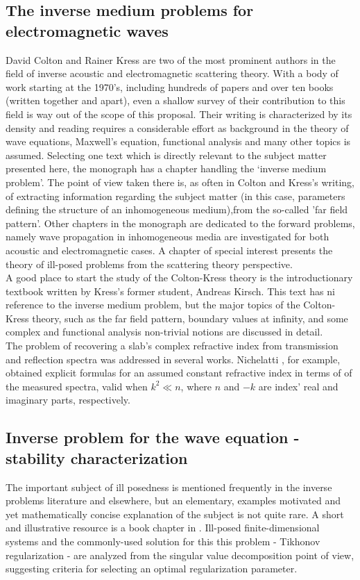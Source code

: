 \documentclass[12pt,twoside]{report}
\begin{document}
\subsection{The inverse medium problems for electromagnetic waves}
David Colton and Rainer Kress are two of the most prominent authors in the field of inverse acoustic and electromagnetic scattering theory. With a body of work starting at the 1970's, including hundreds of papers and over ten books (written together and apart), even a shallow survey of their contribution to this field is way out of the scope of this proposal. Their writing is characterized by its density and reading requires a considerable effort as background in the theory of wave equations, Maxwell's equation, functional analysis and many other topics is assumed. Selecting one text which is directly relevant to the subject matter presented here, the monograph \cite{ColtonKress1997} has a chapter handling the `inverse medium problem'. The point of view taken there is, as often in Colton and Kress's writing, of extracting information regarding the subject matter (in this case, parameters defining the structure of an inhomogeneous medium),from the so-called 'far field pattern'. Other chapters in the monograph are dedicated to the forward problems, namely wave propagation in inhomogeneous media are investigated for both acoustic and electromagnetic cases. A chapter of special interest presents the theory of ill-posed problems from the scattering theory perspective.\\
A good place to start the study of the Colton-Kress theory is the introductionary textbook \cite{Kirsch2011} written by Kress's former student, Andreas Kirsch. This text has ni reference to the inverse medium problem, but the major topics of the Colton-Kress theory, such as the far field pattern, boundary values at infinity, and some complex and functional analysis non-trivial notions are discussed in detail.\\

The problem of recovering a slab's complex refractive index from transmission and reflection spectra was addressed in several works. Nichelatti \cite{Nichelatti2002}, for example, obtained explicit formulas for an assumed constant refractive index in terms of of the measured spectra, valid when $k^2 \ll n$, where $n$ and $-k$ are index' real and imaginary parts, respectively.

\subsection{Inverse problem for the wave equation - stability characterization}
The important subject of ill posedness is mentioned frequently in the inverse problems literature and elsewhere, but an elementary, examples motivated and yet mathematically concise explanation of the subject is not quite rare. A short and illustrative resource is a book chapter in \cite{Kress1997}. Ill-posed finite-dimensional systems and the commonly-used solution for this this problem - Tikhonov regularization - are analyzed from the singular value decomposition point of view, suggesting criteria for selecting an optimal regularization parameter.\\
\end{document}
